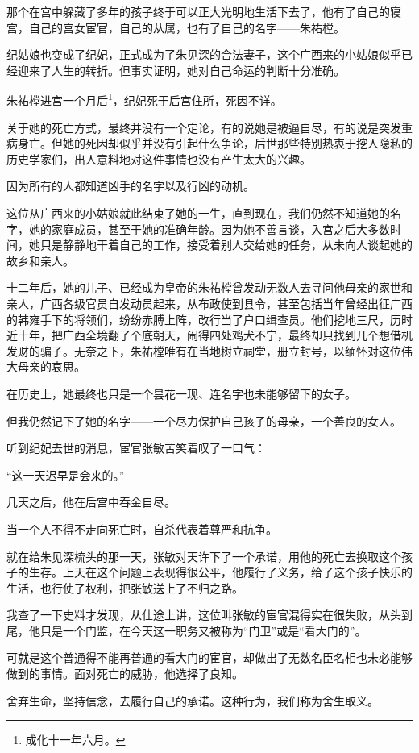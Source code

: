 \begin{multicols}{\theparacolNo}
		那个在宫中躲藏了多年的孩子终于可以正大光明地生活下去了，他有了自己的寝宫，自己的宫女宦官，自己的从属，也有了自己的名字——朱祐樘。

		纪姑娘也变成了纪妃，正式成为了朱见深的合法妻子，这个广西来的小姑娘似乎已经迎来了人生的转折。但事实证明，她对自己命运的判断十分准确。

		朱祐樘进宫一个月后\footnote{成化十一年六月。}，纪妃死于后宫住所，死因不详。

		关于她的死亡方式，最终并没有一个定论，有的说她是被逼自尽，有的说是突发重病身亡。但她的死因却似乎并没有引起什么争论，后世那些特别热衷于挖人隐私的历史学家们，出人意料地对这件事情也没有产生太大的兴趣。

		因为所有的人都知道凶手的名字以及行凶的动机。

		这位从广西来的小姑娘就此结束了她的一生，直到现在，我们仍然不知道她的名字，她的家庭成员，甚至于她的准确年龄。因为她不善言谈，入宫之后大多数时间，她只是静静地干着自己的工作，接受着别人交给她的任务，从未向人谈起她的故乡和亲人。

		十二年后，她的儿子、已经成为皇帝的朱祐樘曾发动无数人去寻问他母亲的家世和亲人，广西各级官员自发动员起来，从布政使到县令，甚至包括当年曾经出征广西的韩雍手下的将领们，纷纷赤膊上阵，改行当了户口缉查员。他们挖地三尺，历时近十年，把广西全境翻了个底朝天，闹得四处鸡犬不宁，最终却只找到几个想借机发财的骗子。无奈之下，朱祐樘唯有在当地树立祠堂，册立封号，以缅怀对这位伟大母亲的哀思。

		在历史上，她最终也只是一个昙花一现、连名字也未能够留下的女子。

		但我仍然记下了她的名字——一个尽力保护自己孩子的母亲，一个善良的女人。

		听到纪妃去世的消息，宦官张敏苦笑着叹了一口气：

		“这一天迟早是会来的。”

		几天之后，他在后宫中吞金自尽。

		当一个人不得不走向死亡时，自杀代表着尊严和抗争。

		就在给朱见深梳头的那一天，张敏对天许下了一个承诺，用他的死亡去换取这个孩子的生存。上天在这个问题上表现得很公平，他履行了义务，给了这个孩子快乐的生活，也行使了权利，把张敏送上了不归之路。

		我查了一下史料才发现，从仕途上讲，这位叫张敏的宦官混得实在很失败，从头到尾，他只是一个门监，在今天这一职务又被称为“门卫”或是“看大门的”。

		可就是这个普通得不能再普通的看大门的宦官，却做出了无数名臣名相也未必能够做到的事情。面对死亡的威胁，他选择了良知。

		舍弃生命，坚持信念，去履行自己的承诺。这种行为，我们称为舍生取义。


\end{multicols}
